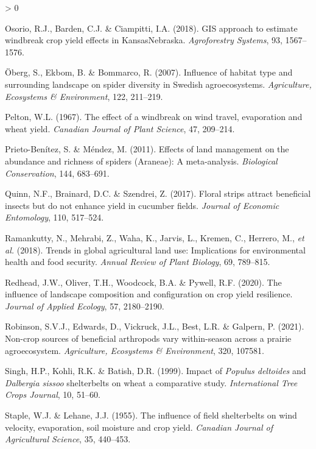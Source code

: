 \documentclass[]{elsarticle} %
\newlength{\cslhangindent}
\newenvironment{CSLReferences}[2] %
 {%
  \setlength{\parindent}{0pt}
  \ifodd #1 \everypar{\setlength{\hangindent}{\cslhangindent}}\ignorespaces\fi
  \ifnum #2 > 0
  \setlength{\parskip}{#2\baselineskip}
  \fi
 }%
 {}
\begin{document}
\begin{CSLReferences}{1}{0}
\leavevmode\hypertarget{ref-osorio2018}{}%
Osorio, R.J., Barden, C.J. \& Ciampitti, I.A. (2018). {GIS} approach to estimate windbreak crop yield effects in {Kansas}{{}}{Nebraska}. \emph{Agroforestry Systems}, 93, 1567--1576.

\leavevmode\hypertarget{ref-oberg2007}{}%
Öberg, S., Ekbom, B. \& Bommarco, R. (2007). Influence of habitat type and surrounding landscape on spider diversity in {Swedish} agroecosystems. \emph{Agriculture, Ecosystems {\&} Environment}, 122, 211--219.

\leavevmode\hypertarget{ref-pelton1967}{}%
Pelton, W.L. (1967). The effect of a windbreak on wind travel, evaporation and wheat yield. \emph{Canadian Journal of Plant Science}, 47, 209--214.

\leavevmode\hypertarget{ref-prietoBenitez2011}{}%
Prieto-Benítez, S. \& Méndez, M. (2011). Effects of land management on the abundance and richness of spiders ({Araneae}): A meta-analysis. \emph{Biological Conservation}, 144, 683--691.

\leavevmode\hypertarget{ref-quinn2017}{}%
Quinn, N.F., Brainard, D.C. \& Szendrei, Z. (2017). Floral strips attract beneficial insects but do not enhance yield in cucumber fields. \emph{Journal of Economic Entomology}, 110, 517--524.

\leavevmode\hypertarget{ref-ramankutty2018}{}%
Ramankutty, N., Mehrabi, Z., Waha, K., Jarvis, L., Kremen, C., Herrero, M., \emph{et al.} (2018). Trends in global agricultural land use: Implications for environmental health and food security. \emph{Annual Review of Plant Biology}, 69, 789--815.

\leavevmode\hypertarget{ref-redhead2020}{}%
Redhead, J.W., Oliver, T.H., Woodcock, B.A. \& Pywell, R.F. (2020). The influence of landscape composition and configuration on crop yield resilience. \emph{Journal of Applied Ecology}, 57, 2180--2190.

\leavevmode\hypertarget{ref-robinson2021}{}%
Robinson, S.V.J., Edwards, D., Vickruck, J.L., Best, L.R. \& Galpern, P. (2021). Non-crop sources of beneficial arthropods vary within-season across a prairie agroecosystem. \emph{Agriculture, Ecosystems {\&} Environment}, 320, 107581.

\leavevmode\hypertarget{ref-singh1999}{}%
Singh, H.P., Kohli, R.K. \& Batish, D.R. (1999). Impact of {\emph{Populus deltoides}} and {\emph{Dalbergia sissoo}} shelterbelts on wheat {}a comparative study. \emph{International Tree Crops Journal}, 10, 51--60.

\leavevmode\hypertarget{ref-staple1955}{}%
Staple, W.J. \& Lehane, J.J. (1955). The influence of field shelterbelts on wind velocity, evaporation, soil moisture and crop yield. \emph{Canadian Journal of Agricultural Science}, 35, 440--453.


\end{CSLReferences}
\end{document}
